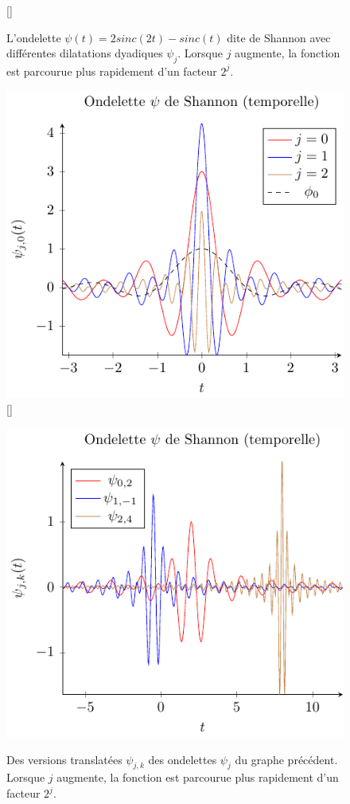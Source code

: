 \begin{figure}
	[\FBwidth]
	{\caption{L'ondelette $\psi(t) = 2sinc(2t) - sinc(t)$ dite de Shannon avec différentes dilatations dyadiques $\psi_j$. Lorsque $j$ augmente, la fonction est parcourue plus rapidement d'un facteur $2^j$.}}
	{\includegraphics{Figs/shannon}}
	\label{fig:shannon}
	[\FBwidth]
		{\caption{Des versions translatées $\psi_{j,k}$ des ondelettes $\psi_j$ du graphe précédent. Lorsque $j$ augmente, la fonction est parcourue plus rapidement d'un facteur $2^j$.}}
	{\includegraphics{Figs/shannonspat}}
\end{figure}
